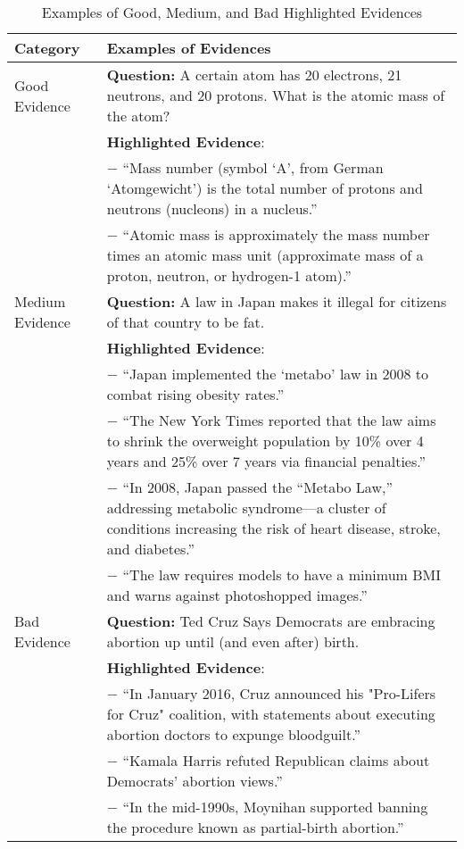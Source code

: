 \appendix

\begin{table*}[t]
\centering
\footnotesize
\begin{tabularx}{\textwidth}{lX}
\toprule
\textbf{Category} & \textbf{Examples of Evidences} \\
\midrule
Good Evidence &
\textbf{Question:} A certain atom has 20 electrons, 21 neutrons, and 20 protons. What is the atomic mass of the atom?\\[1ex]
& \textbf{Highlighted Evidence}:\\[0.5ex]
& \quad $-$ ``Mass number (symbol `A', from German `Atomgewicht') is the total number of protons and neutrons (nucleons) in a nucleus.''\\[0.5ex]
& \quad $-$ ``Atomic mass is approximately the mass number times an atomic mass unit (approximate mass of a proton, neutron, or hydrogen-1 atom).''\\[1ex]
Medium Evidence &
\textbf{Question:} A law in Japan makes it illegal for citizens of that country to be fat.\\[1ex]
& \textbf{Highlighted Evidence}:\\[0.5ex]
& \quad $-$ ``Japan implemented the `metabo' law in 2008 to combat rising obesity rates.''\\[0.5ex]
& \quad $-$ ``The New York Times reported that the law aims to shrink the overweight population by 10\% over 4 years and 25\% over 7 years via financial penalties.''\\[0.5ex]
& \quad $-$ ``In 2008, Japan passed the ``Metabo Law,'' addressing metabolic syndrome—a cluster of conditions increasing the risk of heart disease, stroke, and diabetes.''\\[0.5ex]
& \quad $-$ ``The law requires models to have a minimum BMI and warns against photoshopped images.''\\[1ex]
Bad Evidence &
\textbf{Question:} Ted Cruz Says Democrats are embracing abortion up until (and even after) birth.\\[1ex]
& \textbf{Highlighted Evidence}:\\[0.5ex]
& \quad $-$ ``In January 2016, Cruz announced his "Pro-Lifers for Cruz" coalition, with statements about executing abortion doctors to expunge bloodguilt.''\\[0.5ex]
& \quad $-$ ``Kamala Harris refuted Republican claims about Democrats' abortion views.''\\[0.5ex]
& \quad $-$ ``In the mid-1990s, Moynihan supported banning the procedure known as partial-birth abortion.''\\
\bottomrule
\end{tabularx}
\caption{Examples of Good, Medium, and Bad Highlighted Evidences}
\label{tab:evidence_quality_examples}
\end{table*}

